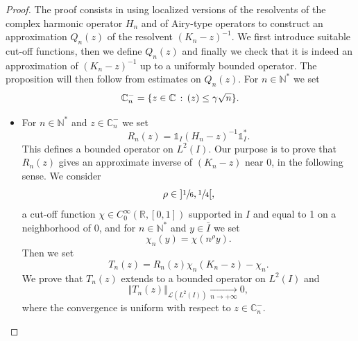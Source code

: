 \documentclass[11pt]{article}
\numberwithin{equation}{section}
\let\mathcal\mathscr
\theoremstyle{plain}
\theoremstyle{definition}
\newcommand {\limt}[2]{\xrightarrow[#1 \to #2]{}}
\newcommand{\nr}[1]{\Vert #1\Vert}
\newcommand{\set}[1]{\{ #1\}}
\newcommand{\inv}{^{-1}}
\newcommand{\1}{\mathds 1}
\newcommand{\st}{\,:\,}
\let\Re\relax
\DeclareMathOperator{\Re}{\mathsf{Re}\mkern2mu}
\newcommand{\R}{\mathbb{R}}
\def\C{\mathbb{C}}
\newcommand{\N}{\mathbb{N}}
\let\g\gamma
\let\h\chi
\newcommand{\Lc}{{\mathcal L}}
\begin{document}
\begin{proof}
The proof consists in using localized versions of the resolvents of the complex harmonic operator $H_n$ and of Airy-type operators to construct an approximation $Q_n(z)$ of the resolvent $(K_n-z)\inv$. We first introduce suitable cut-off functions, then we define $Q_n(z)$ and finally we check that it is indeed an approximation
of $(K_n -z)^{-1}$ up to a uniformly bounded operator. The proposition will then follow from estimates on $Q_n(z)$.
For $n \in \N^*$ we set
\[
\C_n^- = \set{z \in \C \st \Re(z) \leq \g \sqrt n}.
\]

\begin{itemize}
\item
For $n \in \N^*$ and $z \in \C_n^-$ we set
\[
R_n(z) = \1_I (H_n-z)\inv \1_I^*.
\]
This defines a bounded operator on $L^2(I)$. Our purpose is to prove that $R_n(z)$ gives an approximate inverse of $(K_n-z)$ near 0, in the following sense. We consider
\[
\rho \in{}]\sfrac 16,\sfrac 14[,
\]
a cut-off function $\h \in C_0^\infty(\R,[0,1])$ supported in $I$ and equal to 1 on a neighborhood of 0, and for $n \in \N^*$ and $y \in \bar I$ we set
\[
\h_n(y) = \h(n^\rho y).
\]
Then we set
\[
T_n(z) = R_n(z) \chi_n (K_n-z) - \chi_n.
\]
We prove that $T_n(z)$ extends to a bounded operator on $L^2(I)$ and
\begin{equation} \label{estim-res-Rn}
\nr{T_n(z)}_{\Lc(L^2(I))} \limt n {+\infty} 0,
\end{equation}
where the convergence is uniform with respect to $z \in \C_n^-$.


\end{itemize}
\end{proof}
\end{document}
